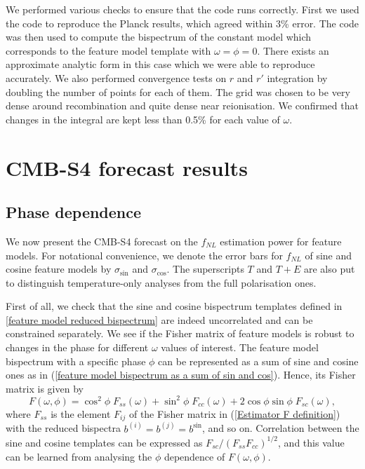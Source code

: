 We performed various checks to ensure that the code runs correctly. First we used the code to reproduce the Planck results, which agreed within 3\% error. The code was then used to compute the bispectrum of the constant model which corresponds to the feature model template with $\omega=\phi=0$. There exists an approximate analytic form in this case \cite{Fergusson2012} which we were able to reproduce accurately. We also performed convergence tests on $r$ and $r'$ integration by doubling the number of points for each of them. The grid was chosen to be very dense around recombination and quite dense near reionisation. We confirmed that changes in the integral are kept less than 0.5\% for each value of $\omega$.


\section{CMB-S4 forecast results} \label{section: CMB-S4 forecast results}
\subsection{Phase dependence}

We now present the CMB-S4 forecast on the $f_{NL}$ estimation power for feature models. For notational convenience, we denote the error bars for $f_{NL}$ of sine and cosine feature models by $\sigma_{\sin}$ and $\sigma_{\cos}$. The superscripts $T$ and $T+E$ are also put to distinguish temperature-only analyses from the full polarisation ones.

First of all, we check that the sine and cosine bispectrum templates defined in \ref{feature model reduced bispectrum} are indeed uncorrelated and can be constrained separately. We see if the Fisher matrix of feature models is robust to changes in the phase for different $\omega$ values of interest. The feature model bispectrum with a specific phase $\phi$ can be represented as a sum of sine and cosine ones as in (\ref{feature model bispectrum as a sum of sin and cos}). Hence, its Fisher matrix is given by
\begin{equation}
	F(\omega, \phi) = \cos^2\phi \; F_{ss}(\omega) + \sin^2\phi \; F_{cc}(\omega) + 2\cos\phi\sin\phi \; F_{sc}(\omega),
\end{equation}
where $F_{ss}$ is the element $F_{ij}$ of the Fisher matrix in (\ref{Estimator F definition}) with the reduced bispectra $b^{(i)} = b^{(j)} = b^{\sin}$, and so on. Correlation between the sine and cosine templates can be expressed as $F_{sc}/(F_{ss}F_{cc})^{1/2}$, and this value can be learned from analysing the $\phi$ dependence of $F(\omega,\phi)$.

